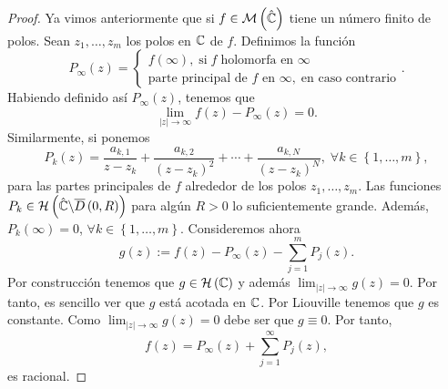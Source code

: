 \begin{proof}
Ya vimos anteriormente que si $\displaystyle f\in \mathcal{M}\left(\hat{\mathbb{C}}\right) $ tiene un número finito de polos. Sean $\displaystyle z_{1}, \ldots, z_{m} $ los polos en $\displaystyle \mathbb{C} $ de $\displaystyle f $. Definimos la función
\[P_{\infty}\left(z\right)=
\begin{cases}
f\left(\infty\right), \; \text{si} \; f \; \text{holomorfa en }\infty \\
\text{parte principal de $\displaystyle f $ en $\displaystyle \infty $}, \; \text{en caso contrario}
\end{cases}
.\]
Habiendo definido así $\displaystyle P_{\infty}\left(z\right) $, tenemos que 
\[\lim_{ \left|z\right| \to \infty }f\left(z\right)-P_{\infty}\left(z\right)=0 .\]
Similarmente, si ponemos
\[P_{k}\left(z\right)=\frac{a_{k,1}}{z-z_{k}} + \frac{a_{k,2}}{\left(z-z_{k}\right)^{2}} + \cdots + \frac{a_{k,N}}{\left(z-z_{k}\right)^{N}}, \; \forall k \in \left\{ 1, \ldots, m\right\}  ,\]
para las partes principales de $\displaystyle f $ alrededor de los polos $\displaystyle z_{1}, \ldots, z_{m} $. Las funciones $\displaystyle P_{k}\in \mathcal{H}\left(\hat{\mathbb{C}}\backslash \overline{D}\left(0,R\right)\right) $ para algún $\displaystyle R > 0 $ lo suficientemente grande. Además, $\displaystyle P_{k}\left(\infty \right)=0 $, $\displaystyle \forall k \in \left\{ 1, \ldots, m\right\}  $. Consideremos ahora 
\[g\left(z\right):=f\left(z\right)-P_{\infty}\left(z\right)-\sum^{m}_{j = 1}P_{j}\left(z\right) .\]
Por construcción tenemos que $\displaystyle g \in \mathcal{H}\left(\mathbb{C}\right) $ y además $\displaystyle \lim_{ \left|z\right| \to \infty}g\left(z\right)=0 $. Por tanto, es sencillo ver que $\displaystyle g $ está acotada en $\displaystyle \mathbb{C} $. 
Por Liouville tenemos que $\displaystyle g $ es constante. Como $\displaystyle \lim_{ \left|z\right| \to \infty }g\left(z\right)=0 $ debe ser que $\displaystyle g \equiv 0 $. Por tanto, 
\[f\left(z\right)=P_{\infty}\left(z\right)+\sum^{\infty}_{j = 1}P_{j}\left(z\right) ,\]
es racional.
\end{proof}
